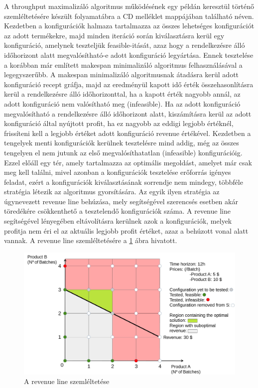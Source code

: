 A throughput maximalizáló algoritmus működésének egy példán keresztül történő szemléltetésére készült folyamatábra a CD melléklet  mappájában található  néven.
Kezdetben a konfigurációk halmaza tartalmazza az összes lehetséges konfigurációt az adott termékekre, majd minden iteráció során kiválasztásra kerül egy konfiguráció, amelynek teszteljük feasible-itását, azaz hogy a rendelkezésre álló időhorizont alatt megvalósítható-e adott konfiguráció legyártása.
Ennek tesztelése a korábban már említett makespan minimalizáló algoritmus felhasználásával a legegyszerűbb.
A makespan minimalizáló algoritmusnak átadásra kerül adott konfiguráció recept gráfja, majd az eredményül kapott idő érték összehasonlításra kerül a rendelkezésre álló időhorizonttal, ha a kapott érték nagyobb annál, az adott konfiguráció nem valósítható meg (infeasible). 
Ha az adott konfiguráció megvalósítható a rendelkezésre álló időhorizont alatt, kiszámításra kerül az adott konfiguráció által nyújtott profit, ha ez nagyobb az eddigi legjobb értéknél, frissíteni kell a legjobb értéket adott konfiguráció revenue értékével.
Kezdetben a tengelyek menti konfigurációk kerülnek tesztelésre mind addig, még az összes tengelyen el nem jutunk az első megvalósíthatatlan (infeasible) konfigurációig.
Ezzel előáll egy tér, amely tartalmazza az optimális megoldást, amelyet már csak meg kell találni, mivel azonban a konfigurációk tesztelése erőforrás igényes feladat, ezért a konfigurációk kiválasztásának sorrendje nem mindegy, többféle stratégia létezik az algoritmus gyorsítására. \cite{phd_Hegyhati}
Az egyik ilyen stratégia az úgynevezett revenue line behúzása, mely segítségével szerencsés esetben akár töredékére csökkenthető a tesztelendő konfigurációk száma.
A revenue line segítségével lényegében eltávolításra kerülnek azok a konfigurációk, melyek profitja nem éri el az aktuális legjobb profit értéket, azaz a behúzott vonal alatt vannak.
A revenue line szemléltetésére a \ref{revLine} ábra hivatott.
 \begin{figure}[H]
\begin{center}
\includegraphics[scale=0.3]{revLine}
\caption{A revenue line szemléltetése}
\label{revLine}
\end{center}
\end{figure}
